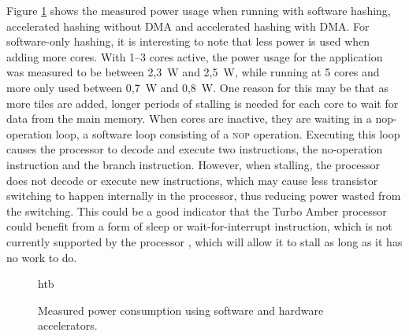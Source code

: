 Figure \ref{fig:power-plot} shows the measured power usage when running with software hashing, accelerated hashing without DMA
and accelerated hashing with DMA.
For software-only hashing, it is interesting to note that less power is used when adding more cores. With 1--3 cores
active, the power usage for the application was measured to be between 2,3~W and 2,5~W, while running at 5 cores and
more only used between 0,7~W and 0,8~W.
One reason for this may be that as more tiles are added, longer periods of stalling is needed for each core to wait for data from
the main memory. When cores are inactive, they are waiting in a nop-operation loop, a software loop consisting of a
\textsc{nop} operation. Executing this loop causes the processor to decode and execute two instructions,
the no-operation instruction and the branch instruction. However, when stalling, the processor does not decode or
execute new instructions, which may cause less transistor switching to happen internally in the processor, thus reducing power
wasted from the switching. This could be a good indicator that the Turbo Amber processor could benefit
from a form of sleep or wait-for-interrupt instruction, which is not currently supported by the processor \cite{amber-spec}, which will
allow it to stall as long as it has no work to do.

\begin{figure}{htb}
	\centering
	\caption{Measured power consumption using software and hardware accelerators.}
	\label{fig:power-plot}
\end{figure}

